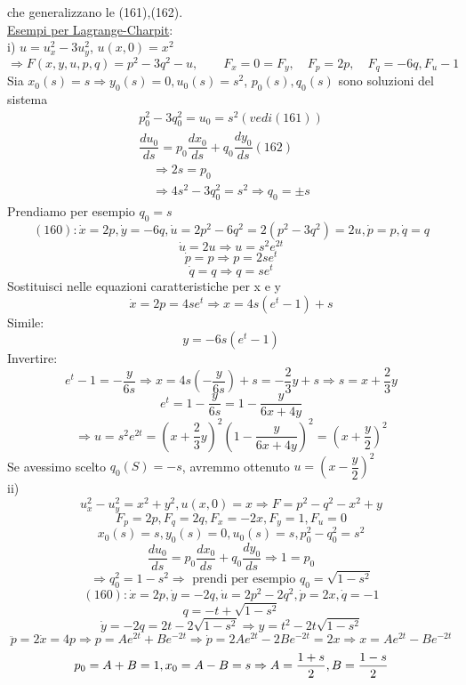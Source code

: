 \documentclass[a4paper,11pt]{report}
\begin{document}
che generalizzano le (161),(162).\\
\underline{Esempi per Lagrange-Charpit}:\\
i) $u=u_x^2 - 3u_y^2$, $u(x,0)=x^2$
$$
\Rightarrow F(x,y,u,p,q)=p^2-3q^2-u, \qquad F_x=0=F_y, \quad F_p=2p, \quad F_q=-6q, F_u-1
$$
Sia $x_0(s)=s \Rightarrow y_0(s)=0, u_0(s)=s^2$, $p_0(s),q_0(s)$ sono soluzioni del sistema
\begin{equation}
\begin{matrix}
p_0^2 - 3q_0^2=u_0=s^2 (vedi (161))\\
\dfrac{du_0}{ds}=p_0 \dfrac{dx_0}{ds}+q_0\dfrac{dy_0}{ds}(162)
\end{matrix}
\end{equation}
$$
\begin{matrix}
\Rightarrow 2s=p_0\\
\Rightarrow 4s^2 - 3q_0^2 = s^2 \Rightarrow q_0=\pm s
\end{matrix}
$$
Prendiamo per esempio $q_0=s$
$$
(160): \dot{x}=2p, \dot{y}=-6q, \dot{u}=2p^2 - 6q^2 = 2(p^2-3q^2)=2u, \dot{p}=p, \dot{q}=q
$$
$$
\dot{u}=2u \Rightarrow u=s^2e^{2t}
$$
$$
\dot{p}=p \Rightarrow p=2se^t
$$
$$
\dot{q}=q \Rightarrow q=se^t
$$
Sostituisci nelle equazioni caratteristiche per x e y
$$
\dot{x}=2p=4se^t \Rightarrow x= 4s(e^t -1) +s
$$
Simile:
$$
y=-6s(e^t -1)
$$
Invertire:
$$
e^t-1=-\dfrac{y}{6s} \Rightarrow x=4s\left(-\dfrac{y}{6s}\right) + s=-\dfrac{2}{3}y + s \Rightarrow s=x+\dfrac{2}{3}y
$$
$$
e^t=1-\dfrac{y}{6s}=1-\dfrac{y}{6x+4y} 
$$
$$
\Rightarrow u=s^2 e^{2t}= \left(x+\dfrac{2}{3}y\right)^2\left(1-\dfrac{y}{6x+4y}\right)^2=\left(x+\dfrac{y}{2}\right)^2
$$
Se avessimo scelto $q_0(S)=-s$, avremmo ottenuto $u=\left(x-\dfrac{y}{2}\right)^2$\\
ii)
$$
u_x^2 - u_y^2 = x^2 + y^2, u(x,0)=x \Rightarrow F = p^2 - q^2 - x^2 + y
$$
$$
F_p=2p, F_q=2q, F_x = -2x, F_y=1, F_u=0
$$
$$
x_0(s)=s, y_0(s)=0, u_0(s)=s, p_0^2 - q_0^2 = s^2
$$
$$
\dfrac{du_0}{ds}=p_0\dfrac{dx_0}{ds}+q_0\dfrac{dy_0}{ds} \Rightarrow 1=p_0
$$
$$
\Rightarrow q_0^2=1-s^2 \Rightarrow \text{ prendi per esempio } q_0=\sqrt{1-s^2}
$$
$$
(160): \dot{x}=2p, \dot{y}=-2q, \dot{u}=2p^2 - 2q^2, \dot{p}=2x, \dot{q}=-1
$$
$$
q=-t+\sqrt{1-s^2}
$$
$$
\dot{y}=-2q=2t-2\sqrt{1-s^2} \Rightarrow y= t^2-2t\sqrt{1-s^2}
$$
$$
\ddot{p}=2\dot{x}=4p \Rightarrow p=Ae^{2t} + Be^{-2t} \Rightarrow \dot{p}=2Ae^{2t}-2Be^{-2t}=2x \Rightarrow x=Ae^{2t}-Be^{-2t}
$$
$$
p_0=A+B=1, x_0=A-B=s \Rightarrow A=\dfrac{1+s}{2}, \\B=\dfrac{1-s}{2}
$$
\end{document}
